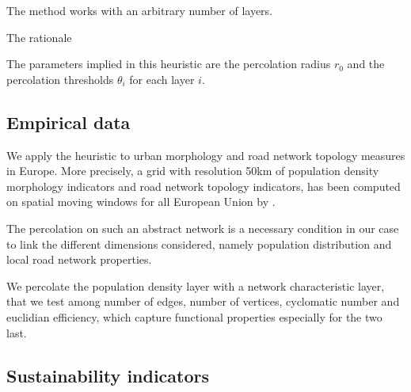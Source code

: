 \documentclass{jimis-en}
\begin{document}
The method works with an arbitrary number of layers.

The rationale




The parameters implied in this heuristic are the percolation radius $r_0$ and the percolation thresholds $\theta_i$ for each layer $i$.



\subsection{Empirical data}


We apply the heuristic to urban morphology and road network topology measures in Europe. More precisely, a grid with resolution 50km of population density morphology indicators and road network topology indicators, has been computed on spatial moving windows for all European Union by \cite{raimbault2018urban}.

The percolation on such an abstract network is a necessary condition in our case to link the different dimensions considered, namely population distribution and local road network properties.

We percolate the population density layer with a network characteristic layer, that we test among number of edges, number of vertices, cyclomatic number and euclidian efficiency, which capture functional properties especially for the two last.






\subsection{Sustainability indicators}
\end{document}
